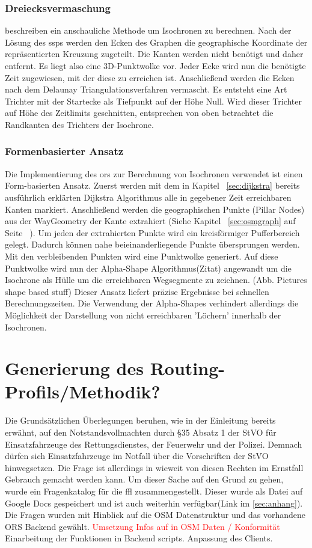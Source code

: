 \documentclass[12pt,a4paper]{article}
\newcommand\todo[1]{\textcolor{red}{#1}}
\begin{document}
\subsubsection{Dreiecksvermaschung}
\cite{isochrones} beschreiben ein anschauliche Methode um Isochronen zu berechnen. 
Nach der Lösung des \gls{ssp}s werden den Ecken des Graphen die geographische Koordinate der repräsentierten Kreuzung zugeteilt. Die Kanten werden nicht benötigt und daher entfernt. 
Es liegt also eine 3D-Punktwolke vor. 
Jeder Ecke wird nun die benötigte Zeit zugewiesen, mit der diese zu erreichen ist. 
Anschließend werden die Ecken nach dem Delaunay Triangulationsverfahren vermascht. 
Es entsteht eine Art Trichter mit der Startecke als Tiefpunkt auf der Höhe Null. 
Wird dieser Trichter auf Höhe des Zeitlimits geschnitten, entsprechen von oben betrachtet die Randkanten des Trichters der Isochrone.


\subsubsection{Formenbasierter Ansatz}
Die Implementierung des \gls{ors} zur Berechnung von Isochronen verwendet ist einen Form-basierten Ansatz. Zuerst werden mit dem in Kapitel ~\ref{sec:dijkstra} bereits ausführlich erklärten Dijkstra Algorithmus alle in gegebener Zeit erreichbaren Kanten markiert. Anschließend werden die geographischen Punkte (Pillar Nodes) aus der WayGeometry der Kante extrahiert (Siehe Kapitel ~\ref{sec:osmgraph} auf Seite ~\pageref{sec:osmgraph}). Um jeden der extrahierten Punkte wird ein kreisförmiger Pufferbereich gelegt. Dadurch können nahe beieinanderliegende Punkte übersprungen werden. Mit den verbleibenden Punkten wird eine Punktwolke generiert. Auf diese Punktwolke wird nun der Alpha-Shape Algorithmus(Zitat) angewandt um die Isochrone als Hülle um die erreichbaren Wegsegmente zu zeichnen.
(Abb. Pictures shape based stuff)
Dieser Ansatz liefert präzise Ergebnisse bei schnellen Berechnungszeiten. Die Verwendung der Alpha-Shapes verhindert allerdings die Möglichkeit der Darstellung von nicht erreichbaren 'Löchern' innerhalb der Isochronen.

\newpage
\section{Generierung des Routing-Profils/Methodik?}
Die Grundsätzlichen Überlegungen beruhen, wie in der Einleitung bereits erwähnt, auf den Notstandsvollmachten durch §35 Absatz 1 der StVO für Einsatzfahrzeuge des Rettungsdienstes, der Feuerwehr und der Polizei. Demnach dürfen sich Einsatzfahrzeuge im Notfall über die Vorschriften der StVO hinwegsetzen. Die Frage ist allerdings in wieweit von diesen Rechten im Ernstfall Gebrauch gemacht werden kann. Um dieser Sache auf den Grund zu gehen, wurde ein Fragenkatalog für die \gls{ffl} zusammengestellt. Dieser wurde als Datei auf Google Docs gespeichert und ist auch weiterhin verfügbar(Link im \ref{sec:anhang}). Die Fragen wurden mit Hinblick auf die OSM Datenstruktur und das vorhandene ORS Backend gewählt. \todo{Umsetzung Infos auf in OSM Daten / Konformität} Einarbeitung der Funktionen in Backend scripts. Anpassung des Clients.
\end{document}
